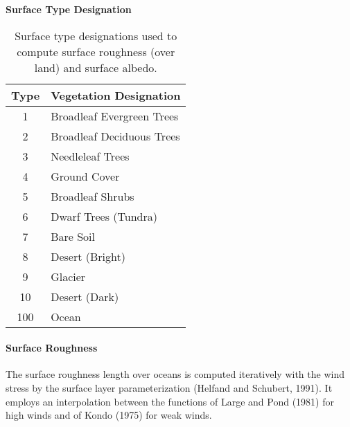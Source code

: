 \begin{table}
\begin{center}
{\bf Surface Type Designation} \\
\vspace{0.1in}
\begin{tabular}{ |c|l| }
\hline
Type & Vegetation Designation \\ \hline
\hline
  1 & Broadleaf Evergreen Trees \\ \hline
  2 & Broadleaf Deciduous Trees \\ \hline
  3 & Needleleaf Trees \\ \hline
  4 & Ground Cover \\ \hline   
  5 & Broadleaf Shrubs \\ \hline
  6 & Dwarf Trees (Tundra) \\ \hline
  7 & Bare Soil \\ \hline
  8 & Desert (Bright) \\ \hline
  9 & Glacier \\ \hline
 10 & Desert (Dark) \\ \hline
100 & Ocean \\ \hline
\end{tabular}
\end{center}
\caption{Surface type designations used to compute surface roughness (over land) 
and surface albedo.}
\label{tab:fizhi:surftype}
\end{table}
 
 
\begin{figure*}[htbp]
  \centerline{  \epsfysize=7in  }
  \vspace{0.3in}
  \caption  {Surface Type Compinations at \txt resolution.}
  \label{fig:fizhi:surftype}
\end{figure*}

\begin{figure*}[htbp]
  \centerline{  \epsfysize=7in  }
  \vspace{0.3in}
  \caption  {Surface Type Descriptions.}
  \label{fig:fizhi:surftype.desc}
\end{figure*}


\paragraph{Surface Roughness}
The surface roughness length over oceans is computed iteratively with the wind
stress by the surface layer parameterization (Helfand and Schubert, 1991).
It employs an interpolation between the functions of Large and Pond (1981)
for high winds and of Kondo (1975) for weak winds.


